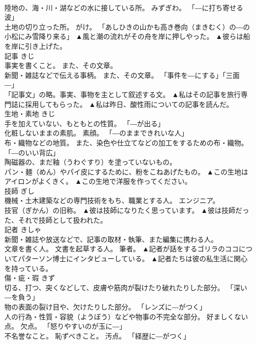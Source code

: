 \documentclass[8pt]{extreport}
\begin{document}
\begin{CJK}{UTF8}{min}
\\	陸地の、海・川・湖などの水に接している所。 みずぎわ。 「―に打ち寄せる波」 
\\	土地の切り立った所。 がけ。 「あしひきの山かも高き巻向（まきむく）の―の小松にみ雪降り来る」	▲風と潮の流れがその舟を岸に押しやった。 ▲彼らは船を岸に引き上げた。
\\	記事	きじ	
\\	事実を書くこと。 また、その文章。 
\\	新聞・雑誌などで伝える事柄。 また、その文章。 「事件を―にする」「三面―」 
\\	「記事文」の略。事実、事物を主として叙述する文。	▲私はその記事を旅行専門誌に採用してもらった。 ▲私は昨日、酸性雨についての記事を読んだ。
\\	生地・素地	きじ	
\\	手を加えていない、もともとの性質。 「―が出る」 
\\	化粧しないままの素肌。 素顔。 「―のままできれいな人」 
\\	布・織物などの地質。 また、染色や仕立てなどの加工をするための布・織物。 「―のいい背広」 
\\	陶磁器の、まだ釉（うわぐすり）を塗っていないもの。 
\\	パン・麺（めん）やパイ皮にするために、粉をこねあげたもの。	▲この生地はアイロンがよくきく。 ▲この生地で洋服を作ってください。
\\	技師	ぎし	
\\	機械・土木建築などの専門技術をもち、職業とする人。 エンジニア。 
\\	技官（ぎかん）の旧称。	▲彼は技師になりたく思っています。 ▲彼は技師だった、それで技師として扱われた。
\\	記者	きしゃ	
\\	新聞・雑誌や放送などで、記事の取材・執筆、また編集に携わる人。 
\\	文章を書く人。 文書を起草する人。 筆者。	▲記者が話をするゴリラのココについてパターソン博士にインタビューしている。 ▲記者たちは彼の私生活に関心を持っている。
\\	傷・疵・瑕	きず	
\\	切る、打つ、突くなどして、皮膚や筋肉が裂けたり破れたりした部分。 「深い―を負う」 
\\	物の表面の裂け目や、欠けたりした部分。 「レンズに―がつく」 
\\	人の行為・性質・容貌（ようぼう）などや物事の不完全な部分。 好ましくない点。 欠点。 「怒りやすいのが玉に―」 
\\	不名誉なこと。 恥ずべきこと。 汚点。 「経歴に―がつく」 

\end{CJK}
\end{document}
